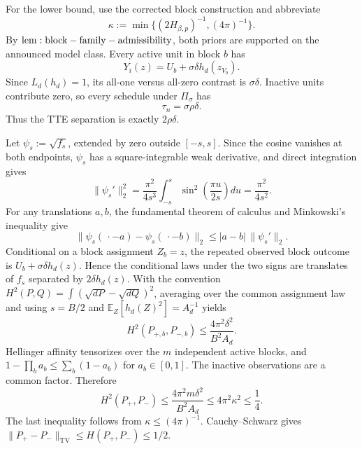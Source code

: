 For the lower bound, use the corrected block construction and abbreviate
\[
\kappa:=\min\{(2H_{\beta,p})^{-1},(4\pi)^{-1}\}.
\]
By \({\rm lem:block-family-admissibility}\), both priors are supported on the announced model class. Every active unit in block \(b\) has
\[
Y_i(z)=U_b+\sigma\delta h_d(z_{V_b}).
\]
Since \(L_d(h_d)=1\), its all-one versus all-zero contrast is \(\sigma\delta\). Inactive units contribute zero, so every schedule under \(\Pi_\sigma\) has
\[
\tau_n=\sigma\rho\delta.
\]
Thus the TTE separation is exactly \(2\rho\delta\).

Let \(\psi_s:=\sqrt{f_s}\), extended by zero outside \([-s,s]\). Since the cosine vanishes at both endpoints, \(\psi_s\) has a square-integrable weak derivative, and direct integration gives
\[
\|\psi_s'\|_2^2
=\frac{\pi^2}{4s^3}\int_{-s}^{s}\sin^2\!\left(\frac{\pi u}{2s}\right)du
=\frac{\pi^2}{4s^2}.
\]
For any translations \(a,b\), the fundamental theorem of calculus and Minkowski's inequality give
\[
\|\psi_s(\,\cdot-a)-\psi_s(\,\cdot-b)\|_2
\le |a-b|\,\|\psi_s'\|_2.
\]
Conditional on a block assignment \(Z_b=z\), the repeated observed block outcome is \(U_b+\sigma\delta h_d(z)\). Hence the conditional laws under the two signs are translates of \(f_s\) separated by \(2\delta h_d(z)\). With the convention \(H^2(P,Q)=\int(\sqrt{dP}-\sqrt{dQ})^2\), averaging over the common assignment law and using \(s=B/2\) and \(\mathbb E_Z[h_d(Z)^2]=A_d^{-1}\) yields
\[
H^2(P_{+,b},P_{-,b})
\le\frac{4\pi^2\delta^2}{B^2A_d}.
\]
Hellinger affinity tensorizes over the \(m\) independent active blocks, and \(1-\prod_b a_b\le\sum_b(1-a_b)\) for \(a_b\in[0,1]\). The inactive observations are a common factor. Therefore
\[
H^2(P_+,P_-)
\le\frac{4\pi^2m\delta^2}{B^2A_d}
\le4\pi^2\kappa^2\le\frac14.
\]
The last inequality follows from \(\kappa\le(4\pi)^{-1}\). Cauchy--Schwarz gives \(\|P_+-P_-\|_{\mathrm{TV}}\le H(P_+,P_-)\le1/2\).

